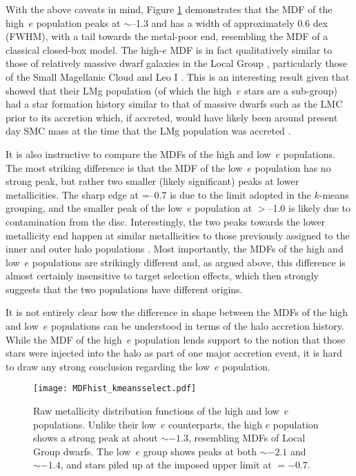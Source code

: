 With the above caveats in mind, Figure \ref{fig:mdfs}
demonstrates that the MDF of the high~$e$ population peaks at \feh{}$\sim$--1.3
and has a width of approximately 0.6 dex (FWHM), with a tail towards
the metal-poor end, resembling the MDF of a classical closed-box
model.  The high-$e$ MDF is in fact qualitatively similar to those of
relatively massive dwarf galaxies in the Local Group
\citep[e.g.][]{2015AJ....149..198R}, particularly those of the Small Magellanic Cloud \citep[SMC,][]{2014MNRAS.442.1680D}
and Leo I \citep{2013ApJ...779..102K}. This is an interesting result
given that \citet{2018ApJ...852...49H} showed that their LMg
population (of which the high~$e$ stars are a sub-group) had a star
formation history similar to that of massive dwarfs such
as the LMC prior to its accretion which, if accreted, would have likely been
around present day SMC mass \citep[$\sim 3\times 10^{8}
\mathrm{M_{\odot}}$, e.g.][]{2004ApJ...604..176S,2018MNRAS.478.5017R}
at the time that the LMg population was accreted
\citep{2009IAUS..256...81V,2018arXiv180606038H}.

It is also instructive to compare the MDFs of the high and low~$e$
populations.  The most striking difference is that the MDF of the
low~$e$ population has no strong peak, but rather two smaller (likely
significant) peaks at lower metallicities.  The sharp edge at
\feh{}=--0.7 is due to the \feh{} limit adopted in the $k$-means
grouping, and the smaller peak of the low~$e$ population at
\feh{}$>$--1.0 is likely due to contamination from the disc.  Interestingly,
the two peaks towards the lower metallicity end happen at similar
metallicities to those previously assigned to the inner and outer
halo populations
\citep[e.g.][]{2007Natur.450.1020C,2014A&A...568A...7A,2015A&A...577A..81F}.
Most importantly, the MDFs of the high and low~$e$ populations are
strikingly different and, as argued above, this difference
is almost certainly insensitive to target selection effects, which
then strongly suggests that the two populations have different
origins.

It is not entirely clear how the difference in shape between the
MDFs of the high and low~$e$ populations can be understood in terms of the halo accretion history.  While the MDF of the high~$e$
population lends support to the notion that those stars were injected
into the halo as part of one major accretion event, it is
hard to draw any strong conclusion regarding the low~$e$ population.

\begin{figure}
\texttt{[image: MDFhist\_kmeansselect.pdf]}
\caption[Metallicity distribution functions of the $k$-means groups identified in Section \ref{highe}]{\label{fig:mdfs} Raw metallicity distribution functions
of the high and low~$e$ populations.  Unlike their low~$e$ counterparts,
the high $e$ population shows a strong peak at about \feh{}$\sim
-1.3$, resembling MDFs of Local Group dwarfs. The low~$e$ group
shows peaks at both \feh{} $\sim -2.1$ and $\sim -1.4$, and stars
piled up at the imposed upper \feh{} limit at \feh{} $= -0.7$.
}
\end{figure}

